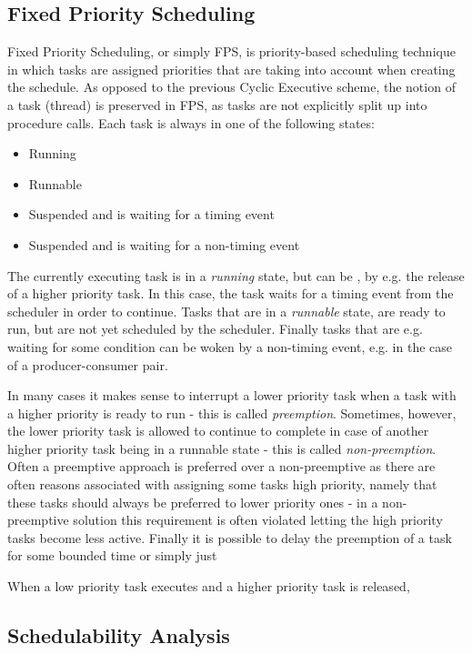\subsection{Fixed Priority Scheduling}
Fixed Priority Scheduling, or simply FPS, is priority-based scheduling technique in which tasks are assigned priorities that are taking into account when creating the schedule. As opposed to the previous Cyclic Executive scheme, the notion of a task (thread) is preserved in FPS, as tasks are not explicitly split up into procedure calls. Each task is always in one of the following states:

\begin{itemize}
	\item Running
	\item Runnable
	\item Suspended and is waiting for a timing event
	\item Suspended and is waiting for a non-timing event
\end{itemize}

The currently executing task is in a \textit{running} state, but can be , by e.g. the release of a higher priority task. In this case, the task waits for a timing event from the scheduler in order to continue. Tasks that are in a \textit{runnable} state, are ready to run, but are not yet scheduled by the scheduler. Finally tasks that are e.g. waiting for some condition can be woken by a non-timing event, e.g. in the case of a producer-consumer pair. 

In many cases it makes sense to interrupt a lower priority task when a task with a higher priority is ready to run - this is called \textit{preemption}. Sometimes, however, the lower priority task is allowed to continue to complete in case of another higher priority task being in a runnable state - this is called \textit{non-preemption}. Often a preemptive approach is preferred over a non-preemptive as there are often reasons associated with assigning some tasks high priority, namely that these tasks should always be preferred to lower priority ones - in a non-preemptive solution this requirement is often violated letting the high priority tasks become less active. Finally it is possible to delay the preemption of a task for some bounded time or simply just  


 When a low priority task executes and a higher priority task is released,  


\subsection{Schedulability Analysis} %
\label{sec:schedulability_analysis}


